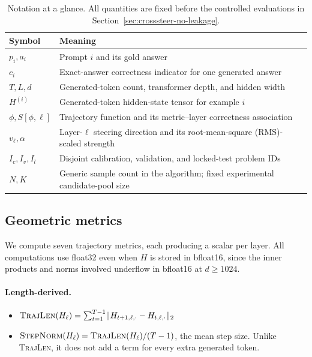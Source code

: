 \begin{table}[tbp]
\centering
\small
\caption{Notation at a glance. All quantities are fixed before the controlled
evaluations in Section~\ref{sec:crosssteer-no-leakage}.}
\label{tab:notation}
\begin{tabular}{@{}lp{}@{}}
\toprule
Symbol & Meaning \\
\midrule
$p_i, a_i$ & Prompt $i$ and its gold answer \\
$c_i$ & Exact-answer correctness indicator for one generated answer \\
$T, L, d$ & Generated-token count, transformer depth, and hidden width \\
$H^{(i)}$ & Generated-token hidden-state tensor for example $i$ \\
$\phi, S[\phi,\ell]$ & Trajectory function and its metric--layer correctness association \\
$v_\ell, \alpha$ & Layer-$\ell$ steering direction and its root-mean-square (RMS)-scaled strength \\
$I_c, I_v, I_l$ & Disjoint calibration, validation, and locked-test problem IDs \\
$N, K$ & Generic sample count in the algorithm; fixed experimental candidate-pool size \\
\bottomrule
\end{tabular}
\end{table}

\subsection{Geometric metrics}

We compute seven trajectory metrics, each producing a scalar per layer. All
computations use float32 even when $H$ is stored in bfloat16, since the inner
products and norms involved underflow in bfloat16 at $d \ge 1024$.

\paragraph{Length-derived.}
\begin{itemize}
\item $\textsc{TrajLen}(H_\ell) = \sum_{t=1}^{T-1} \lVert H_{t+1,\ell,\cdot} - H_{t,\ell,\cdot}\rVert_2$
\item $\textsc{StepNorm}(H_\ell) = \textsc{TrajLen}(H_\ell) / (T-1)$, the
mean step size. Unlike \textsc{TrajLen}, it does not add a term for every
extra generated token.
\end{itemize}

